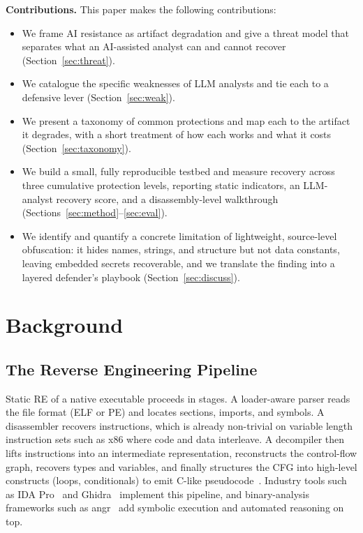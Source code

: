 \documentclass[conference]{IEEEtran}
\begin{document}
\textbf{Contributions.} This paper makes the following contributions:
\begin{itemize}
\item We frame AI resistance as artifact degradation and give a threat model
that separates what an AI-assisted analyst can and cannot recover
(Section~\ref{sec:threat}).
\item We catalogue the specific weaknesses of LLM analysts and tie each to a
defensive lever (Section~\ref{sec:weak}).
\item We present a taxonomy of common protections and map each to the artifact
it degrades, with a short treatment of how each works and what it costs
(Section~\ref{sec:taxonomy}).
\item We build a small, fully reproducible testbed and measure recovery across
three cumulative protection levels, reporting static indicators, an LLM-analyst
recovery score, and a disassembly-level walkthrough
(Sections~\ref{sec:method}--\ref{sec:eval}).
\item We identify and quantify a concrete limitation of lightweight,
source-level obfuscation: it hides names, strings, and structure but not data
constants, leaving embedded secrets recoverable, and we translate the finding
into a layered defender's playbook (Section~\ref{sec:discuss}).
\end{itemize}

\section{Background}
\subsection{The Reverse Engineering Pipeline}
Static RE of a native executable proceeds in stages. A loader-aware parser reads
the file format (ELF or PE) and locates sections, imports, and symbols. A
disassembler recovers instructions, which is already non-trivial on variable
length instruction sets such as x86 where code and data interleave. A decompiler
then lifts instructions into an intermediate representation, reconstructs the
control-flow graph, recovers types and variables, and finally structures the CFG
into high-level constructs (loops, conditionals) to emit C-like
pseudocode~\cite{nomoregotos}. Industry tools such as IDA Pro~\cite{idabook} and
Ghidra~\cite{ghidra} implement this pipeline, and binary-analysis frameworks such
as angr~\cite{angr} add symbolic execution and automated reasoning on top.
\end{document}
